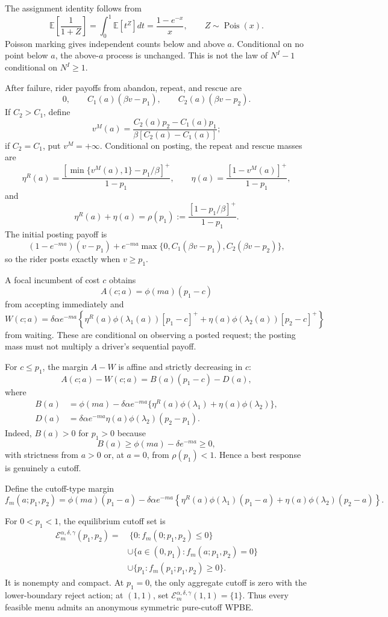 \documentclass[mnsc,dblanonrev]{informs4}
\newcommand{\E}{\mathbb E}
\newcommand{\calE}{\mathcal E}
\newcommand{\ph}{\phi}
\begin{document}
The assignment identity follows from
\[
 \E\left[\frac1{1+Z}\right]=\int_0^1\E[t^Z]dt
 =\frac{1-e^{-x}}x,\qquad Z\sim\operatorname{Pois}(x).
\]
Poisson marking gives independent counts below and above $a$.  Conditional on
no point below $a$, the above-$a$ process is unchanged.  This is not the law
of $N^I-1$ conditional on $N^I\ge1$.

After failure, rider payoffs from abandon, repeat, and rescue are
\[
 0,\qquad C_1(a)(\beta v-p_1),\qquad
 C_2(a)(\beta v-p_2).
\]
If $C_2>C_1$, define
\[
 v^M(a)=\frac{C_2(a)p_2-C_1(a)p_1}
 {\beta[C_2(a)-C_1(a)]};
\]
if $C_2=C_1$, put $v^M=+\infty$.  Conditional on posting, the repeat and
rescue masses are
\[
 \eta^R(a)=
 \frac{[\min\{v^M(a),1\}-p_1/\beta]^+}{1-p_1},
 \qquad
 \eta(a)=\frac{[1-v^M(a)]^+}{1-p_1},             \tag{2}
\]
and
\[
 \eta^R(a)+\eta(a)=
 \rho(p_1):=\frac{[1-p_1/\beta]^+}{1-p_1}.       \tag{3}
\]
The initial posting payoff is
\[
 (1-e^{-ma})(v-p_1)+e^{-ma}
 \max\{0,C_1(\beta v-p_1),C_2(\beta v-p_2)\},
\]
so the rider posts exactly when $v\ge p_1$.

A focal incumbent of cost $c$ obtains
\[
 A(c;a)=\ph(ma)(p_1-c)                           \tag{4}
\]
from accepting immediately and
\[
 W(c;a)=\delta\alpha e^{-ma}\left\{
 \eta^R(a)\ph(\lambda_1(a))[p_1-c]^+
 +\eta(a)\ph(\lambda_2(a))[p_2-c]^+
 \right\}                                       \tag{5}
\]
from waiting.  These are conditional on observing a posted request; the
posting mass must not multiply a driver's sequential payoff.

For $c\le p_1$, the margin $A-W$ is affine and strictly decreasing in $c$:
\[
 A(c;a)-W(c;a)=B(a)(p_1-c)-D(a),                 \tag{6}
\]
where
\[
\begin{aligned}
 B(a)&=\ph(ma)-\delta\alpha e^{-ma}
 \{\eta^R(a)\ph(\lambda_1)+\eta(a)\ph(\lambda_2)\},\\
 D(a)&=\delta\alpha e^{-ma}\eta(a)\ph(\lambda_2)(p_2-p_1).
\end{aligned}
\]
Indeed, $B(a)>0$ for $p_1>0$ because
\[
 B(a)\ge\ph(ma)-\delta e^{-ma}\ge0,
\]
with strictness from $a>0$ or, at $a=0$, from $\rho(p_1)<1$.  Hence a best
response is genuinely a cutoff.

Define the cutoff-type margin
\[
 f_m(a;p_1,p_2)=\ph(ma)(p_1-a)
 -\delta\alpha e^{-ma}\left\{
 \eta^R(a)\ph(\lambda_1)(p_1-a)
 +\eta(a)\ph(\lambda_2)(p_2-a)
 \right\}.                                      \tag{7}
\]

\begin{proposition}
\label{prop:wpbe}
For $0<p_1<1$, the equilibrium cutoff set is
\[
\begin{aligned}
 \calE_m^{\alpha,\delta,\gamma}(p_1,p_2)
 =&\ \{0:f_m(0;p_1,p_2)\le0\}\\
 &\cup\{a\in(0,p_1):f_m(a;p_1,p_2)=0\}\\
 &\cup\{p_1:f_m(p_1;p_1,p_2)\ge0\}.
\end{aligned}                                    \tag{8}
\]
It is nonempty and compact.  At $p_1=0$, the only aggregate cutoff is zero
with the lower-boundary reject action; at $(1,1)$, set
$\calE_m^{\alpha,\delta,\gamma}(1,1)=\{1\}$.  Thus every feasible menu admits an
anonymous symmetric pure-cutoff WPBE.
\end{proposition}
\end{document}
